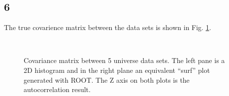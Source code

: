 \documentclass[singlepage,notitlepage,nofootinbib,11pt]{revtex4-1}
\begin{document}
\subsection{6}
The true covarience matrix between the data sets is shown in Fig. \ref{comatrix}.
\begin{figure}[h]
\centering
  \captionsetup[subfigure]{labelformat=empty}
  \\
\caption{\label{comatrix} Covariance matrix between 5 universe data sets. The left pane is a 2D histogram and in the right plane an equivalent ``surf'' plot generated with ROOT. The Z axis on both plots is the autocorrelation result.}
\end{figure}
\clearpage
\end{document}
